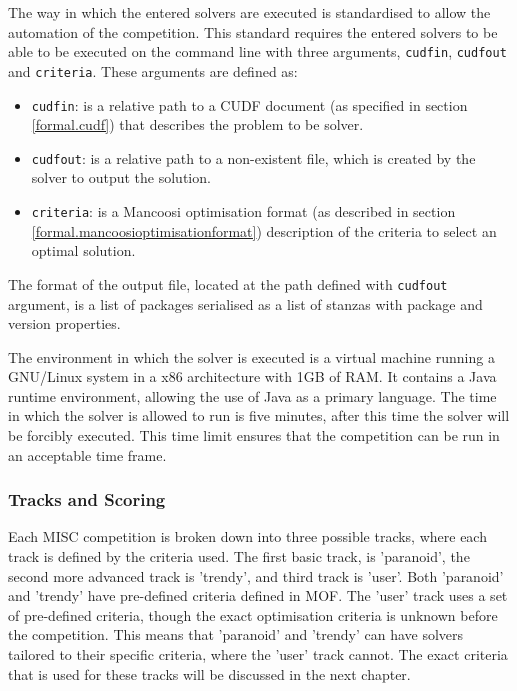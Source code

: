 The way in which the entered solvers are executed is standardised to allow the automation of the competition.
This standard requires the entered solvers to be able to be executed on the command line with three arguments, \verb+cudfin+, \verb+cudfout+ and \verb+criteria+.
These arguments are defined as:
\begin{itemize}
  \item \verb+cudfin+: is a relative path to a CUDF document (as specified in section \ref{formal.cudf}) that describes the problem to be solver.
  \item \verb+cudfout+: is a relative path to a non-existent file, which is created by the solver to output the solution.
  \item \verb+criteria+: is a Mancoosi optimisation format (as described in section \ref{formal.mancoosioptimisationformat}) description of the criteria to select an optimal solution. 
\end{itemize}
The format of the output file, located at the path defined with \verb+cudfout+ argument, is a list of packages serialised as a list of stanzas with package and version properties.

The environment in which the solver is executed is a virtual machine running a GNU/Linux system in a x86 architecture with 1GB of RAM.
It contains a Java runtime environment, allowing the use of Java as a primary language.
The time in which the solver is allowed to run is five minutes, after this time the solver will be forcibly executed.
This time limit ensures that the competition can be run in an acceptable time frame.

\subsubsection{Tracks and Scoring}
Each MISC competition is broken down into three possible tracks, where each track is defined by the criteria used.
The first basic track, is 'paranoid', the second more advanced track is 'trendy', and third track is 'user'.
Both 'paranoid' and 'trendy' have pre-defined criteria defined in MOF.
The 'user' track uses a set of pre-defined criteria, though the exact optimisation criteria is unknown before the competition.
This means that 'paranoid' and 'trendy' can have solvers tailored to their specific criteria, where the 'user' track cannot.
The exact criteria that is used for these tracks will be discussed in the next chapter.

